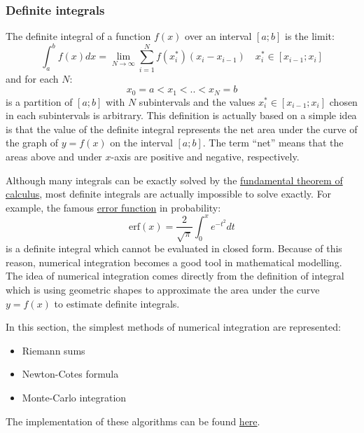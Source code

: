 \subsubsection{Definite integrals}
The definite integral of a function $f(x)$ over an interval $[a;b]$ is the limit:
\begin{equation}
	\int_a^b f(x) dx = \lim_{N \rightarrow \infty} \sum_{i=1}^N f(x^*_i) (x_i - x_{i-1}) \quad x^*_i \in [x_{i-1}; x_i]
\end{equation}
and for each $N$:
\begin{equation}
	x_0 = a < x_1 < .. < x_N = b
\end{equation}
is a partition of $[a;b]$ with $N$ subintervals and the values $x^*_i \in [x_{i-1}; x_i]$ chosen in each subintervals is arbitrary. This definition is actually based on a simple idea is that the value of the definite integral represents the net area under the curve of the graph of $y = f(x)$ on the interval $[a;b]$. The term ``net'' means that the areas above and under $x$-axis are positive and negative, respectively. 

Although many integrals can be exactly solved by the \href{https://en.wikipedia.org/wiki/Fundamental_theorem_of_calculus}{fundamental theorem of calculus}, most definite integrals are actually impossible to solve exactly. For example, the famous \href{https://en.wikipedia.org/wiki/Error_function}{error function} in probability:
\begin{equation}
	\text{erf}(x) = \frac{2}{\sqrt{\pi}} \int_0^x e^{-t^2}dt
\end{equation}
is a definite integral which cannot be evaluated in closed form. Because of this reason, numerical integration becomes a good tool in mathematical modelling. The idea of numerical integration comes directly from the definition of integral which is using geometric shapes to approximate the area under the curve $y = f(x)$ to estimate definite integrals. 

In this section, the simplest methods of numerical integration are represented: 
\begin{itemize}
    \setlength\itemsep{0em}
    \item Riemann sums
    \item Newton-Cotes formula
    \item Monte-Carlo integration
\end{itemize}
The implementation of these algorithms can be found \href{https://github.com/chitn/quantfin_study/blob/master/integration.py}{here}.



